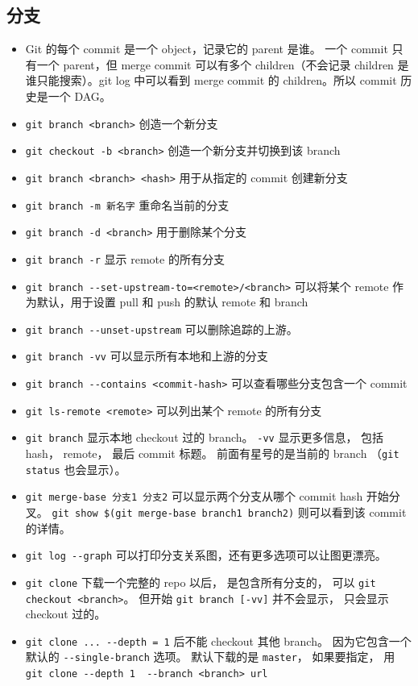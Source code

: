 \subsection{分支}
\begin{itemize}
\item Git 的每个 commit 是一个 object，记录它的 parent 是谁。 一个 commit 只有一个 parent，但 merge commit 可以有多个 children（不会记录 children 是谁只能搜索）。git log 中可以看到 merge commit 的 children。所以 commit 历史是一个 DAG。
\item \verb`git branch <branch>` 创造一个新分支
\item \verb`git checkout -b <branch>` 创造一个新分支并切换到该 branch
\item \verb`git branch <branch> <hash>` 用于从指定的 commit 创建新分支
\item \verb`git branch -m 新名字` 重命名当前的分支
\item \verb`git branch -d <branch>` 用于删除某个分支
\item \verb`git branch -r` 显示 remote 的所有分支
\item \verb`git branch --set-upstream-to=<remote>/<branch>` 可以将某个 remote 作为默认，用于设置 pull 和 push 的默认 remote 和 branch
\item \verb`git branch --unset-upstream` 可以删除追踪的上游。
\item \verb`git branch -vv` 可以显示所有本地和上游的分支
\item \verb`git branch --contains <commit-hash>` 可以查看哪些分支包含一个 commit
\item \verb`git ls-remote <remote>` 可以列出某个 remote 的所有分支
\item \verb`git branch` 显示本地 checkout 过的 branch。 \verb`-vv` 显示更多信息， 包括 hash， remote， 最后 commit 标题。 前面有星号的是当前的 branch （\verb`git status` 也会显示）。
\item \verb`git merge-base 分支1 分支2` 可以显示两个分支从哪个 commit hash 开始分叉。 \verb`git show $(git merge-base branch1 branch2)` 则可以看到该 commit 的详情。
\item \verb`git log --graph` 可以打印分支关系图，还有更多选项可以让图更漂亮。
\item \verb`git clone` 下载一个完整的 repo 以后， 是包含所有分支的， 可以 \verb`git checkout <branch>`。 但开始 \verb`git branch [-vv]` 并不会显示， 只会显示 checkout 过的。
\item \verb`git clone ... --depth = 1` 后不能 checkout 其他 branch。 因为它包含一个默认的 \verb`--single-branch` 选项。 默认下载的是 \verb`master`， 如果要指定， 用 \verb`git clone --depth 1  --branch <branch> url`

\end{itemize}
